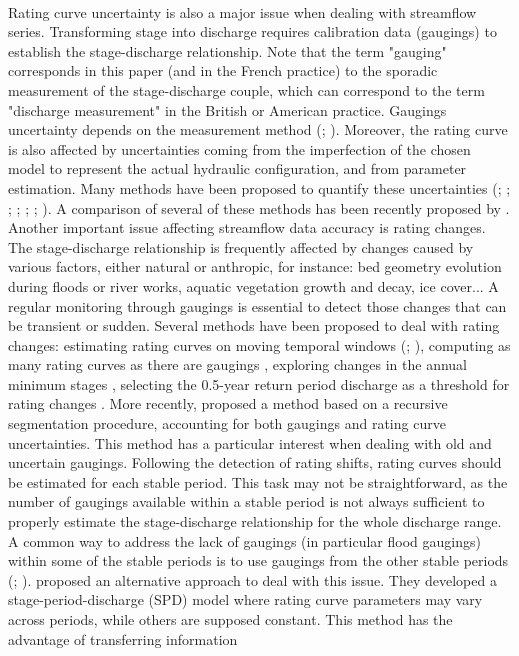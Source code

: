 \documentclass[11pt]{article}
\begin{document}
    \paragraph{}
    Rating curve uncertainty is also a major issue when dealing with streamflow series. Transforming stage into discharge requires calibration data (gaugings) to establish the stage-discharge relationship. Note that the term "gauging" corresponds in this paper (and in the French practice) to the sporadic measurement of the stage-discharge couple, which can correspond to the term "discharge measurement" in the British or American practice. Gaugings uncertainty depends on the measurement method (\citet{lecoz_quantification_2014}; \citet{puechberty_charte_2017}). Moreover, the rating curve is also affected by uncertainties coming from the imperfection of the chosen model to represent the actual hydraulic configuration, and from parameter estimation. Many methods have been proposed to quantify these uncertainties (\citet{petersen-overleir_bayesian_2009}; \citet{juston_rating_2014}; \citet{le_coz_combining_2014}; \citet{morlot_dynamic_2014}; \citet{coxon_novel_2015}; \citet{mcmillan_rating_2015}; \citet{mansanarez_rapid_2019}). A comparison of several of these methods has been recently proposed by \citet{kiang_comparison_2018}. Another important issue affecting streamflow data accuracy is rating changes. The stage-discharge relationship is frequently affected by changes caused by various factors, either natural or anthropic, for instance: bed geometry evolution during floods or river works, aquatic vegetation growth and decay, ice cover... A regular monitoring through gaugings is essential to detect those changes \citep{ibbitt_gauging_1987} that can be transient or sudden. Several methods have been proposed to deal with rating changes: estimating rating curves on moving temporal windows (\citet{westerberg_stage-discharge_2011}; \citet{guerrero_temporal_2012}), computing as many rating curves as there are gaugings \citep{morlot_dynamic_2014}, exploring changes in the annual minimum stages \citep{lapuszek_methods_2015}, selecting the 0.5-year return period discharge as a threshold for rating changes \citep{mcmillan_impacts_2010}. More recently, \citet{darienzo_detection_2021} proposed a method based on a recursive segmentation procedure, accounting for both gaugings and rating curve uncertainties. This method has a particular interest when dealing with old and uncertain gaugings. Following the detection of rating shifts, rating curves should be estimated for each stable period. This task may not be straightforward, as the number of gaugings available within a stable period is not always sufficient to properly estimate the stage-discharge relationship for the whole discharge range. A common way to address the lack of gaugings (in particular flood gaugings) within some of the stable periods is to use gaugings from the other stable periods (\cite{mcmillan_benchmarking_2012}; \cite{puechberty_charte_2017}). \citet{mansanarez_shift_2019} proposed an alternative approach to deal with this issue. They developed a stage-period-discharge (SPD) model where rating curve parameters may vary across periods, while others are supposed constant. This method has the advantage of transferring information 
\end{document}
